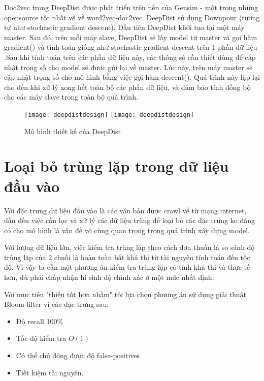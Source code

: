 Doc2vec trong DeepDist được phát triển trên nền của Gensim \cite{Gensim} - một trong những opensource tốt nhất về về word2vec-doc2vec. DeepDist sử dụng Downpour (tương tự như stochastic gradient descent). Đầu tiên DeepDist khởi tạo tại một máy master. Sau đó, trên mỗi máy slave, DeepDist sẽ lấy model từ master và gọi hàm gradient() và tính toán giống như stochastic gradient descent trên 1 phần dữ liệu .Sau khi tính toán trên các phần dữ liệu này, các thông số cần thiết dùng để cấp nhật trọng số cho model sẽ được gửi lại về master. Lúc này, trên máy master sẽ cập nhật trọng số cho mô hình bằng việc gọi hàm descent(). Quá trình này lặp lại cho đến khi xử lý xong hết toàn bộ các phần dữ liệu, và đảm bảo tính đồng bộ cho các máy slave trong toàn bộ quá trình.

\begin{figure}[!htbp]
  \begin{center}
    \ifpdf
      \texttt{[image: deepdistdesign]}
    \else
      \texttt{[image: deepdistdesign]}
    \fi
    \caption{Mô hình thiết kế của DeepDist}
    \label{deepdistdesign}
  \end{center}
\end{figure}

\section{Loại bỏ trùng lặp trong dữ liệu đầu vào}  

Với đặc trưng dữ liệu đầu vào là các văn bản được crawl về từ mạng internet, dẫn đến việc cần lọc và xử lý các dữ liệu trùng để loại bỏ các đặc trưng ko đáng có cho mô hình là vấn đề vô cùng quan trọng trong quá trình xây dựng model.

Với lượng dữ liệu lớn, việc kiểm tra trùng lặp theo cách đơn thuần là so sánh độ trùng lặp của 2 chuỗi là hoàn toàn bất khả thi từ tài nguyên tính toán đến tốc độ. Vì vậy ta cần một phương án kiểm tra trùng lặp có tính khả thi và thực tế hơn, dù phải chấp nhận hi sinh độ chính xác ở một mức nhất định.

Với mục tiêu "thiếu tốt hơn nhầm" tôi lựa chọn phương án sử dụng giải thuật Bloom-filter vì các đặc trưng sau:
\begin{itemize}  

        \item Độ recall 100\%

        \item Tốc độ kiểm tra $O(1)$

        \item Có thể chủ động được độ false-positives 
        
        \item Tiết kiệm tài nguyên. 

    \end{itemize}
    
